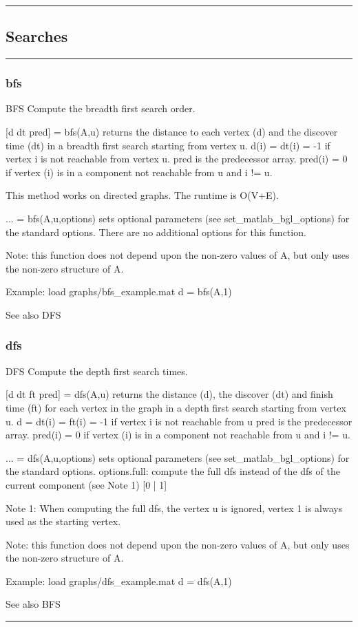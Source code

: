 \newpage
\hrule
\subsection*{Searches}
\vspace{1cm}
\hrule
\subsubsection*{bfs}
\begin{mcode}
  BFS Compute the breadth first search order.
 
  [d dt pred] = bfs(A,u) returns the distance to each vertex (d) and the  
  discover time (dt) in a breadth first search starting from vertex u.
     d(i) = dt(i) = -1 if vertex i is not reachable from vertex u.
  pred is the predecessor array.  pred(i) = 0 if vertex (i)  
  is in a component not reachable from u and i != u.
 
  This method works on directed graphs.
  The runtime is O(V+E).
 
  ... = bfs(A,u,options) sets optional parameters (see 
  set_matlab_bgl_options) for the standard options.
    There are no additional options for this function.
 
  Note: this function does not depend upon the non-zero values of A, but
  only uses the non-zero structure of A.
 
  Example:
     load graphs/bfs_example.mat
     d = bfs(A,1)
 
  See also DFS
\end{mcode}
\newpage
\subsubsection*{dfs}
\begin{mcode}
  DFS Compute the depth first search times.
 
  [d dt ft pred] = dfs(A,u) returns the distance (d), the discover (dt) and
  finish time (ft) for each vertex in the graph in a depth first search 
  starting from vertex u.
    d = dt(i) = ft(i) = -1 if vertex i is not reachable from u
  pred is the predecessor array.  pred(i) = 0 if vertex (i)  
  is in a component not reachable from u and i != u.
  
  ... = dfs(A,u,options) sets optional parameters (see 
  set_matlab_bgl_options) for the standard options.
    options.full: compute the full dfs instead of the dfs of
       the current component (see Note 1) [{0} | 1]
 
  Note 1: When computing the full dfs, the vertex u is ignored, vertex 1 is
  always used as the starting vertex.  
 
  Note: this function does not depend upon the non-zero values of A, but
  only uses the non-zero structure of A.
 
  Example:
     load graphs/dfs_example.mat
     d = dfs(A,1)
 
  See also BFS
\end{mcode}
\newpage
\hrule
